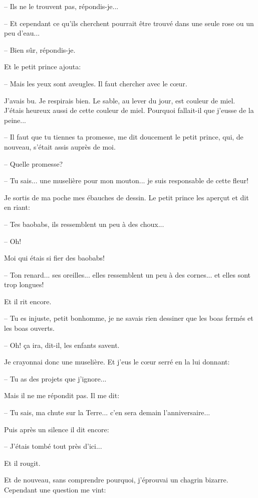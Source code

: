 \documentclass[a4paper]{report}
\begin{document}
-- Ils ne le trouvent pas, répondis-je...

-- Et cependant ce qu'ils cherchent pourrait être trouvé dans une seule rose ou un peu d'eau...

-- Bien sûr, répondis-je.

Et le petit prince ajouta:

-- Mais les yeux sont aveugles. Il faut chercher avec le cœur.

J'avais bu. Je respirais bien. Le sable, au lever du jour, est couleur de miel. J'étais heureux aussi de cette couleur de miel. Pourquoi fallait-il que j'eusse de la peine...

-- Il faut que tu tiennes ta promesse, me dit doucement le petit prince, qui, de nouveau, s'était assis auprès de moi.

-- Quelle promesse?

-- Tu sais... une muselière pour mon mouton... je suis responsable de cette fleur!

Je sortis de ma poche mes ébauches de dessin. Le petit prince les aperçut et dit en riant:

-- Tes baobabs, ils ressemblent un peu à des choux...

-- Oh!

Moi qui étais si fier des baobabs!

-- Ton renard... ses oreilles... elles ressemblent un peu à des cornes... et elles sont trop longues!

Et il rit encore.

-- Tu es injuste, petit bonhomme, je ne savais rien dessiner que les boas fermés et les boas ouverts.

-- Oh! ça ira, dit-il, les enfants savent.

Je crayonnai donc une muselière. Et j'eus le cœur serré en la lui donnant:

-- Tu as des projets que j'ignore...

Mais il ne me répondit pas. Il me dit:

-- Tu sais, ma chute sur la Terre... c'en sera demain l'anniversaire...

Puis après un silence il dit encore:

-- J'étais tombé tout près d'ici...

Et il rougit.

Et de nouveau, sans comprendre pourquoi, j'éprouvai un chagrin bizarre. Cependant une question me vint:
\end{document}
